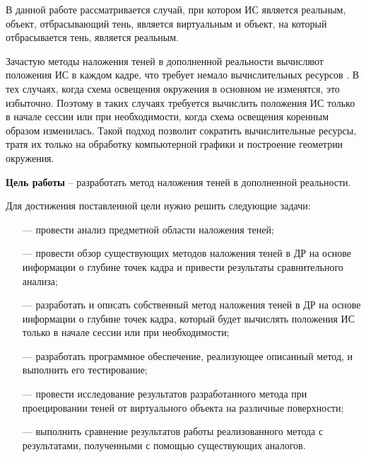 В данной работе рассматривается случай, при котором ИС является реальным, объект, отбрасывающий тень, является виртуальным и объект, на который отбрасывается тень, является реальным.

Зачастую методы наложения теней в дополненной реальности вычисляют положения ИС в каждом кадре, что требует немало вычислительных ресурсов \cite{osti2019real}. В тех случаях, когда схема освещения окружения в основном не изменятся, это избыточно. Поэтому в таких случаях требуется вычислить положения ИС только в начале сессии или при необходимости, когда схема освещения коренным образом изменилась. Такой подход позволит сократить вычислительные ресурсы, тратя их только на обработку компьютерной графики и построение геометрии окружения.

\textbf{Цель работы} -- разработать метод наложения теней в дополненной реальности.

Для достижения поставленной цели нужно решить следующие задачи:

\begin{itemize}
	\item[---] провести анализ предметной области наложения теней;
	\item[---] провести обзор существующих методов наложения теней в ДР на основе информации о глубине точек кадра и привести результаты сравнительного анализа;
	\item[---] разработать и описать собственный метод наложения теней в ДР на основе информации о глубине точек кадра, который будет вычислять положения ИС только в начале сессии или при необходимости;
	\item[---] разработать программное обеспечение, реализующее описанный метод, и выполнить его тестирование;
	\item[---] провести исследование результатов разработанного метода при проецировании теней от виртуального объекта на различные поверхности;
	\item[---] выполнить сравнение результатов работы реализованного метода с результатами, полученными с помощью существующих аналогов.
\end{itemize}